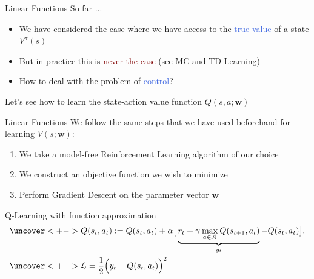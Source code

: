 \documentclass{beamer}
\begin{document}
\begin{frame}{Linear Functions}
	So far ...
	\begin{itemize}
		\item We have considered the case where we have access to the \textcolor{RoyalBlue}{true value} of a state $V^{\pi}(s)$
		\item But in practice this is \textcolor{Maroon}{never the case} (see MC and TD-Learning)
		\item How to deal with the problem of \textcolor{RoyalBlue}{control}?
	\end{itemize}

	\bigskip 

	Let's see how to learn the state-action value function $Q(s,a;\mathbf{w})$

\end{frame}

\begin{frame}{Linear Functions}
	We follow the same steps that we have used beforehand for learning $V(s;\mathbf{w})$:
	\begin{enumerate}
		\item We take a model-free Reinforcement Learning algorithm of our choice
		\item We construct an objective function we wish to minimize 
		\item Perform Gradient Descent on the parameter vector $\mathbf{w}$
	\end{enumerate}


	\begin{block}{Q-Learning with function approximation}	
		\begin{align*}
			& \uncover<+-> {Q(s_t,a_t):=Q(s_t,a_t) + \alpha\big[\underbrace{r_t + \gamma \:\underset{a\in \mathcal{A}}{\max}\:Q(s_{t+1},a_t)}_{y_t} - Q(s_t, a_t) \big].} \\
				& \uncover<+-> {\mathcal{L} = \frac{1}{2}\Big(y_t - Q(s_t, a_t)\Big)^2} \\
		\end{align*}

	\end{block}
	
\end{frame}
\end{document}
